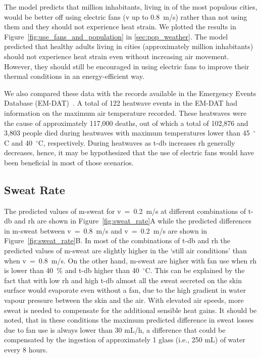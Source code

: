 The model predicts that  million inhabitants, living in  of the most populous cities, would be better off using electric fans (\ac{v} up to 0.8~m/s) rather than not using them and they should not experience heat strain.
We plotted the results in Figure~\ref{fig:use_fans_and_population} in \ref{sec:pop_weather}.
The  model predicted that healthy adults living in  cities (approximately  million inhabitants) should not experience heat strain even without increasing air movement.
However, they should still be encouraged in using electric fans to improve their thermal conditions in an energy-efficient way.

We also compared these data with the records available in the Emergency Events Database (EM-DAT)~\cite{EMDATThe70:online}.
A total of 122 heatwave events in the EM-DAT had information on the maximum air temperature recorded.
These heatwaves were the cause of approximately 117,000 deaths, out of which a total of 102,876 and 3,803 people died during heatwaves with maximum temperatures lower than 45~$^{\circ}$C and 40~$^{\circ}$C, respectively.
During heatwaves as \ac{t-db} increases \ac{rh} generally decreases, hence, it may be hypothesized that the use of electric fans would have been beneficial in most of those scenarios.

\subsection{Sweat Rate}\label{subsec:sweat-rate}

The predicted values of \ac{m-sweat} for \ac{v}~=~0.2~m/s at different combinations of \ac{t-db} and \ac{rh} are shown in Figure~\ref{fig:sweat_rate}A while the predicted differences in \ac{m-sweat} between \ac{v}~=~0.8~m/s and \ac{v}~=~0.2~m/s are shown in Figure~\ref{fig:sweat_rate}B\@.
In most of the combinations of \ac{t-db} and \ac{rh} the predicted values of \ac{m-sweat} are slightly higher in the `still air conditions' than when \ac{v}~=~0.8~m/s.
On the other hand, \ac{m-sweat} are higher with fan use when \ac{rh} is lower than 40~\% and \ac{t-db} higher than 40~$^{\circ}$C\@.
This can be explained by the fact that with low \ac{rh} and high \ac{t-db} almost all the sweat secreted on the skin surface would evaporate even without a fan, due to the high gradient in water vapour pressure between the skin and the air.
With elevated air speeds, more sweat is needed to compensate for the additional sensible heat gains.
It should be noted, that in these conditions the maximum predicted difference in sweat losses due to fan use is always lower than 30 mL/h, a difference that could be compensated by the ingestion of approximately 1 glass (i.e., 250 mL) of water every 8 hours.

